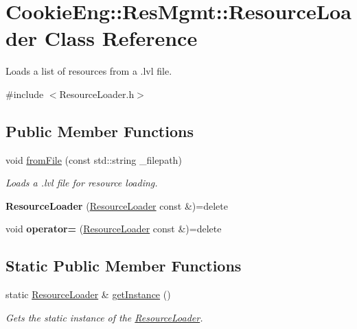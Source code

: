 \hypertarget{class_cookie_eng_1_1_res_mgmt_1_1_resource_loader}{}\section{Cookie\+Eng\+:\+:Res\+Mgmt\+:\+:Resource\+Loader Class Reference}
\label{class_cookie_eng_1_1_res_mgmt_1_1_resource_loader}


Loads a list of resources from a .lvl file.  




{\ttfamily \#include $<$Resource\+Loader.\+h$>$}

\subsection*{Public Member Functions}
\begin{DoxyCompactItemize}
\item 
void \hyperlink{class_cookie_eng_1_1_res_mgmt_1_1_resource_loader_a4af1c2439646b511c41a8154282dff49}{from\+File} (const std\+::string \+\_\+filepath)
\begin{DoxyCompactList}\small\item\em Loads a .lvl file for resource loading. \end{DoxyCompactList}\item 
\mbox{\label{class_cookie_eng_1_1_res_mgmt_1_1_resource_loader_af95b9bc7012acccc4c4193ecd7de36a6}} 
{\bfseries Resource\+Loader} (\hyperlink{class_cookie_eng_1_1_res_mgmt_1_1_resource_loader}{Resource\+Loader} const \&)=delete
\item 
\mbox{\label{class_cookie_eng_1_1_res_mgmt_1_1_resource_loader_a76c36f1bf0bb247bae2061c3b3fdfd37}} 
void {\bfseries operator=} (\hyperlink{class_cookie_eng_1_1_res_mgmt_1_1_resource_loader}{Resource\+Loader} const \&)=delete
\end{DoxyCompactItemize}
\subsection*{Static Public Member Functions}
\begin{DoxyCompactItemize}
\item 
static \hyperlink{class_cookie_eng_1_1_res_mgmt_1_1_resource_loader}{Resource\+Loader} \& \hyperlink{class_cookie_eng_1_1_res_mgmt_1_1_resource_loader_afe0c778fea3c973b5c266a2c74a891ca}{get\+Instance} ()
\begin{DoxyCompactList}\small\item\em Gets the static instance of the \hyperlink{class_cookie_eng_1_1_res_mgmt_1_1_resource_loader}{Resource\+Loader}. \end{DoxyCompactList}\end{DoxyCompactItemize}

